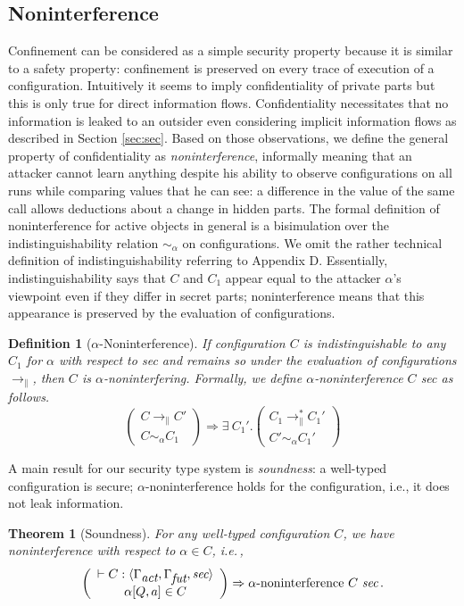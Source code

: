 \documentclass[10pt, conference, compsocconf]{IEEEtran}
\newcommand{\symb}[1]{\makebox{\it #1}}
\newcommand\imp\Longrightarrow
\newcommand\inda{\sim_{\alpha}}
\newcommand\dist{\ensuremath{\to_\|}}
\newcommand\diststar{\ensuremath{\to_\|^*}}
\newcommand\ie{i.e.\!\,, }
\newtheorem{theorem}{Theorem}
\newtheorem{definition}{Definition}[section]
\begin{document}
{\subsection{Noninterference}
Confinement can be considered as a simple security property because it 
is similar to a safety property:
confinement is preserved on every trace of execution of a configuration. Intuitively it seems to imply confidentiality of private parts but this is only true 
for direct information flows.
Confidentiality necessitates that no information is leaked to an outsider even considering implicit information flows as 
described in Section \ref{sec:sec}. Based on those observations, we define the general property 
of confidentiality as {\it noninterference}, informally meaning that an attacker cannot learn anything despite
his ability to observe configurations on all runs while comparing values that he can see: a difference
in the value of the same call allows deductions about a change in hidden parts. The formal 
definition of noninterference for active objects in general \cite{kam:12}
is a bisimulation over the indistinguishability 
relation $\inda$ on configurations. We omit the rather technical definition of indistinguishability 
referring to Appendix D. Essentially, indistinguishability says that $C$ and $C_1$ appear equal to the 
attacker $\alpha$'s viewpoint  
even if they differ in secret parts; noninterference means that this appearance is preserved by the evaluation of configurations. 
\begin{definition}[$\alpha$-Noninterference]
\label{def:ni}
If configuration $C$ is indistinguishable to any $C_1$ for $\alpha$ with respect to {\it sec} 
and remains so under the evaluation of configurations $\dist$, 
then $C$ is $\alpha$-noninterfering.
Formally, we define $\alpha$-noninterference $C$ {\it sec} as follows.
\[ \left(\begin{array}{c} C \dist C' \\ 
                      C \inda C_1  
         \end{array}\right)
\imp 
\exists\ C_1'.\left( \begin{array}{c} C_1 \diststar C_1' \\
                        C' \inda C_1'
       \end{array}\right)
\]
\end{definition}
A main result for our security type system is {\it soundness}: a well-typed configuration is secure; 
$\alpha$-noninterference holds for the configuration, i.e., it does not leak information.
\begin{theorem}[Soundness]
\label{thm:ni}
For any well-typed configuration $C$, 
we have noninterference with respect to $\alpha \in C$, \ie
\[ 
\left(
\begin{array}{c}
\vdash C: \langle \Gamma_{\symb{act}}, \Gamma_{\symb{fut}}, \symb{sec}\rangle \\
 \alpha[Q,a] \in C 
\end{array}\right)
\Rightarrow 
 \alpha{\mbox{\rm {-noninterference}}}\ C\ \symb{sec} \,.
\]



\end{theorem}}
\end{document}
